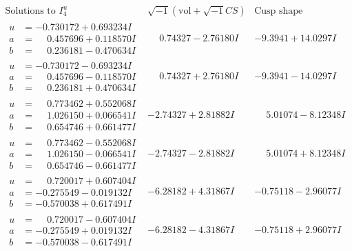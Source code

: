\documentclass[1p]{elsarticle_modified}
\theoremstyle{definition}
\newcommand{\I}{\sqrt{-1}}
\begin{document}
$$\begin{array}{c|c|c}  
\text{Solutions to }I^u_{4}& \I (\text{vol} + \sqrt{-1}CS) & \text{Cusp shape}\\
 \hline 
\begin{aligned}
u &= -0.730172 + 0.693234 I \\
a &= \phantom{-}0.457696 + 0.118570 I \\
b &= \phantom{-}0.236181 - 0.470634 I\end{aligned}
 & \phantom{-}0.74327 - 2.76180 I & -9.3941 + 14.0297 I \\ \hline\begin{aligned}
u &= -0.730172 - 0.693234 I \\
a &= \phantom{-}0.457696 - 0.118570 I \\
b &= \phantom{-}0.236181 + 0.470634 I\end{aligned}
 & \phantom{-}0.74327 + 2.76180 I & -9.3941 - 14.0297 I \\ \hline\begin{aligned}
u &= \phantom{-}0.773462 + 0.552068 I \\
a &= \phantom{-}1.026150 + 0.066541 I \\
b &= \phantom{-}0.654746 + 0.661477 I\end{aligned}
 & -2.74327 + 2.81882 I & \phantom{-}5.01074 - 8.12348 I \\ \hline\begin{aligned}
u &= \phantom{-}0.773462 - 0.552068 I \\
a &= \phantom{-}1.026150 - 0.066541 I \\
b &= \phantom{-}0.654746 - 0.661477 I\end{aligned}
 & -2.74327 - 2.81882 I & \phantom{-}5.01074 + 8.12348 I \\ \hline\begin{aligned}
u &= \phantom{-}0.720017 + 0.607404 I \\
a &= -0.275549 - 0.019132 I \\
b &= -0.570038 + 0.617491 I\end{aligned}
 & -6.28182 + 4.31867 I & -0.75118 - 2.96077 I \\ \hline\begin{aligned}
u &= \phantom{-}0.720017 - 0.607404 I \\
a &= -0.275549 + 0.019132 I \\
b &= -0.570038 - 0.617491 I\end{aligned}
 & -6.28182 - 4.31867 I & -0.75118 + 2.96077 I \\ \hline\begin{aligned}

\end{aligned}
\end{array}$$
\end{document}
